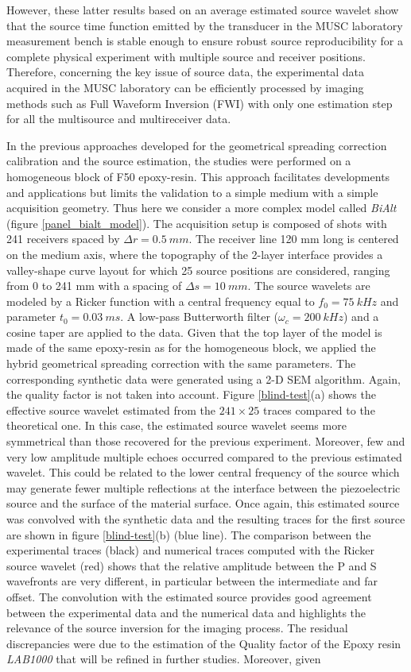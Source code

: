 \documentclass[paper,extra]{gji} %
\newcommand{\twod}{2-D }
\newcommand{\bialt}{\textit{BiAlt} }
\begin{document}
\noindent However, these latter results based on an average estimated source wavelet show that the source time function emitted by the transducer in the MUSC laboratory measurement bench is stable enough to ensure robust source reproducibility for a complete physical experiment with multiple source and receiver positions. Therefore, concerning the key issue of source data, the experimental data acquired in the MUSC laboratory can be efficiently processed by imaging methods such as Full Waveform Inversion (FWI) with only one estimation step for all the multisource and multireceiver data.

\noindent In the previous approaches developed for the geometrical spreading correction calibration and the source estimation, the studies were performed on a homogeneous block of F50 epoxy-resin. This approach facilitates developments and applications but limits the validation to a simple medium with a simple acquisition geometry. Thus here we consider a more complex model called \bialt (figure \ref{panel_bialt_model}). The acquisition setup is composed of shots with 241 receivers spaced by $\Delta r=0.5\ mm$. The receiver line 120 mm long is centered on the medium axis, where the topography of the 2-layer interface provides a valley-shape curve layout for which 25 source positions are considered, ranging from 0 to 241 mm with a spacing of $\Delta s=10\ mm$. The source wavelets are modeled by a Ricker function with a central frequency equal to $f_{0}=75\ kHz$ and parameter $t_{0}=0.03\ ms$. A low-pass Butterworth filter ($\omega_{c}=200\ kHz$) and a cosine taper are applied to the data. Given that the top layer of the model is made of the same epoxy-resin as for the homogeneous block, we applied the hybrid geometrical spreading correction with the same parameters. The corresponding synthetic data were generated using a \twod SEM algorithm. Again, the quality factor is not taken into account. Figure \ref{blind-test}(a) shows the effective source wavelet estimated from the $241 \times 25$ traces compared to the theoretical one. In this case, the estimated source wavelet seems more symmetrical than those recovered for the previous experiment. Moreover, few and very low amplitude multiple echoes occurred compared to the previous estimated wavelet. This could be related to the lower central frequency of the source which may generate fewer multiple reflections at the interface between the piezoelectric source and the surface of the material surface. Once again, this estimated source was convolved with the synthetic data and the resulting traces for the first source are shown in figure \ref{blind-test}(b) (blue line). The comparison between the experimental traces (black) and numerical traces computed with the Ricker source wavelet (red) shows that the relative amplitude between the P and S wavefronts are very different, in particular between the intermediate and far offset. The convolution with the estimated source provides good agreement between the experimental data and the numerical data and highlights the relevance of the source inversion for the imaging process. The residual discrepancies were due to the estimation of the Quality factor of the Epoxy resin \textit{LAB1000} that will be refined in further studies. Moreover, given 
\end{document}
